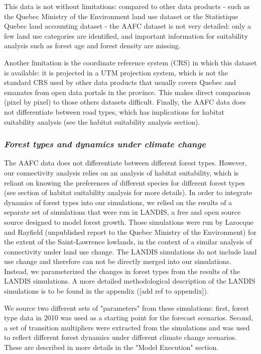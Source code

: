 This data is not without limitations: compared to other data products - such as the Quebec Ministry of the Environment land use dataset or the Statistique Quebec land accounting dataset - the AAFC dataset is not very detailed: only a few land use categories are identified, and important information for suitability analysis such as forest age and forest density are missing. 

Another limitation is the coordinate reference system (CRS) in which this dataset is available: it is projected in a UTM projection system, which is not the standard CRS used by other data products that usually covers Quebec and emanates from open data portals in the province. This makes direct comparison (pixel by pixel) to those others datasets difficult. Finally, the AAFC data does not differentiate between road types, which has implications for habitat suitability analysis (see the habitat suitability analysis section).\\

\subsubsection*{\textit{Forest types and dynamics under climate change}}

The AAFC data does not differentiate between different forest types. However, our connectivity analysis relies on an analysis of habitat suitability, which is reliant on knowing the preferences of different species for different forest types (see section of habitat suitability analysis for more details). In order to integrate dynamics of forest types into our simulations, we relied on the results of a separate set of simulations that were run in LANDIS, a free and open source source designed to model forest growth. Those simulations were run by Larocque and Rayfield (unpublished report to the Quebec Ministry of the Environment) for the extent of the Saint-Lawrence lowlands, in the context of a  similar analysis of connectivity under land use change. The LANDIS simulations do not include land use change and therefore can not be directly merged into our simulations. Instead, we parameterized the changes in forest types from the results of the LANDIS simulations. A more detailed methodological description of the LANDIS simulations is to be found in the appendix ([add ref to appendix]). %

We source two different sets of "parameters" from these simulations: first, forest type data in 2010 was used as a starting point for the forecast scenarios. Second, a set of transition multipliers were extracted from the simulations and was used to reflect different forest dynamics under different climate change scenarios. These are described in more details in the "Model Execution" section.\\

